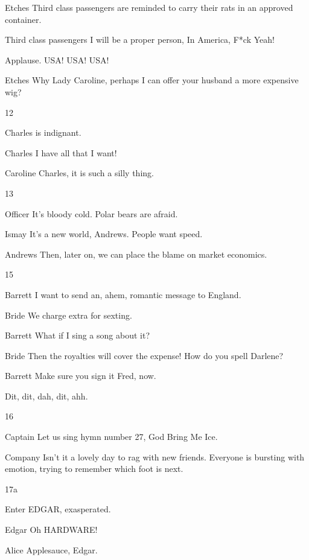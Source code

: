 \documentclass{screenplay}
\newcommand{\andrews}[1]{\begin{dialogue}{Andrews}#1\end{dialogue}}
\newcommand{\alice}[1]{\begin{dialogue}{Alice}#1\end{dialogue}}
\newcommand{\barrett}[1]{\begin{dialogue}{Barrett}#1\end{dialogue}}
\newcommand{\bride}[1]{\begin{dialogue}{Bride}#1\end{dialogue}}
\newcommand{\captain}[1]{\begin{dialogue}{Captain}#1\end{dialogue}}
\newcommand{\caroline}[1]{\begin{dialogue}{Caroline}#1\end{dialogue}}
\newcommand{\charles}[1]{\begin{dialogue}{Charles}#1\end{dialogue}}
\newcommand{\edgar}[1]{\begin{dialogue}{Edgar}#1\end{dialogue}}
\newcommand{\etches}[1]{\begin{dialogue}{Etches}#1\end{dialogue}}
\newcommand{\ismay}[1]{\begin{dialogue}{Ismay}#1\end{dialogue}}
\newcommand{\officer}[1]{\begin{dialogue}{Officer}#1\end{dialogue}}
\newcommand{\third}[1]{\begin{dialogue}{Third class passengers}#1\end{dialogue}}
\newcommand{\company}[1]{\begin{dialogue}{Company}#1\end{dialogue}}
\begin{document}
\etches{
    Third class passengers are reminded to carry their rats in an approved container.
}

\third{
    I will be a proper person,
    In America, F*ck Yeah!
}

Applause.  USA!  USA!  USA!


\etches{
    Why Lady Caroline, perhaps I can offer your husband a more expensive wig?
}

12

Charles is indignant.

\charles{
    I have all that I want!
}

\caroline{
    Charles, it is such a silly thing.
}


13

\officer{
    It's bloody cold.  Polar bears are afraid.
}

\ismay{
    It's a new world, Andrews.  People want speed.
}

\andrews{
    Then, later on, we can place the blame on market economics.
}


15

\barrett{
    I want to send an, ahem, romantic message to England.
}

\bride{
    We charge extra for sexting.
}

\barrett{
    What if I sing a song about it?
}

\bride{
    Then the royalties will cover the expense!
    How do you spell Darlene?
}

\barrett{
    Make sure you sign it Fred, now.
}

Dit, dit, dah, dit, ahh.


16

\captain{
    Let us sing hymn number 27, God Bring Me Ice.
}

\company{
    Isn't it a lovely day to rag with new friends.
    Everyone is bursting with emotion,
    trying to remember which foot is next.
}


17a

Enter EDGAR, exasperated.

\edgar{
    Oh HARDWARE!
}

\alice{
    Applesauce, Edgar.
}
\end{document}
